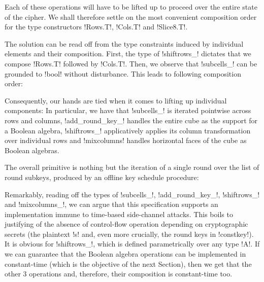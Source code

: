 \documentclass[draft,english]{jflart}
\begin{document}
Each of these operations will have to be lifted up to proceed over the
entire state of the cipher. We shall therefore settle on the most
convenient composition order for the type constructors \coqe!Rows.T!,
\coqe!Cols.T! and \coqe!Slice8.T!.


The solution can be read off from the type constraints induced by
individual elements and their composition. First, the type of
\coqe!shiftrows_! dictates that we compose \coqe!Rows.T! followed by
\coqe!Cols.T!. Then, we observe that \coqe!subcells_! can be grounded
to \coqe!bool! without disturbance. This leads to following 
composition order:
%


Consequently, our hands are tied when it comes to lifting up
individual components:
%
%
In particular, we have that \coqe!subcells_! is iterated pointwise
across rows and columns, \coqe!add_round_key_! handles the entire cube
as the support for a Boolean algebra, \coqe!shiftrows_! applicatively
applies its column transformation over individual rows and
\coqe!mixcolumns! handles horizontal faces of the cube as Boolean
algebras.


The overall primitive is nothing but the iteration of a single round
over the list of round subkeys, produced by an offline key schedule
procedure:
%

Remarkably, reading off the types of \coqe!subcells_!,
\coqe!add_round_key_!, \coqe!shiftrows_! and \coqe!mixcolumns_!, we
can argue that this specification supports an implementation immune to
time-based side-channel attacks. This boils to justifying of the
absence of control-flow operation depending on cryptographic secrets
(the plaintext \coqe!s! and, even more crucially, the round keys in
\coqe!constkey!). It is obvious for \coqe!shiftrows_!, which is
defined parametrically over any type \coqe!A!. If we can guarantee
that the Boolean algebra operations can be implemented in
constant-time (which is the objective of the next Section), then we
get that the other 3 operations and, therefore, their composition is
constant-time too.
\end{document}
